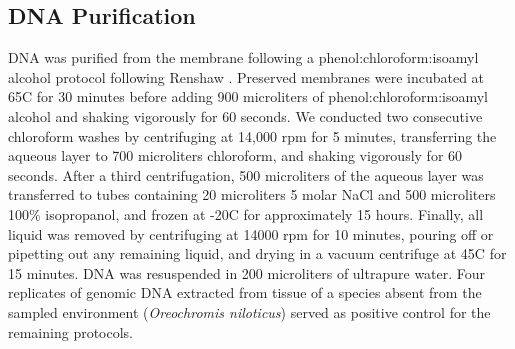 \documentclass[11pt,letterpaper]{article} %
\begin{document}
\subsection*{DNA Purification}
DNA was purified from the membrane following a phenol:chloroform:isoamyl alcohol protocol following Renshaw \citep{Renshaw2014}. Preserved membranes were incubated at 65C for 30 minutes before adding 900 microliters of phenol:chloroform:isoamyl alcohol and shaking vigorously for 60 seconds. We conducted two consecutive chloroform washes by centrifuging at 14,000 rpm for 5 minutes, transferring the aqueous layer to 700 microliters chloroform, and shaking vigorously for 60 seconds. After a third centrifugation, 500 microliters of the aqueous layer was transferred to tubes containing 20 microliters 5 molar NaCl and 500 microliters 100\% isopropanol, and frozen at -20C for approximately 15 hours. Finally, all liquid was removed by centrifuging at 14000 rpm for 10 minutes, pouring off or pipetting out any remaining liquid, and drying in a vacuum centrifuge at 45C for 15 minutes. DNA was resuspended in 200 microliters of ultrapure water. Four replicates of genomic DNA extracted from tissue of a species absent from the sampled environment (\textit{Oreochromis niloticus}) served as positive control for the remaining protocols.
\end{document}
